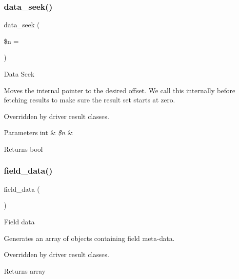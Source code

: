 \subsubsection{\texorpdfstring{data\+\_\+seek()}{data\_seek()}}
{\footnotesize\ttfamily data\+\_\+seek (\begin{DoxyParamCaption}\item[{}]{\$n = {} }\end{DoxyParamCaption})}

Data Seek

Moves the internal pointer to the desired offset. We call this internally before fetching results to make sure the result set starts at zero.

Overridden by driver result classes.


\begin{DoxyParams}[1]{Parameters}
int & {\em \$n} & \\
\hline
\end{DoxyParams}
\begin{DoxyReturn}{Returns}
bool 
\end{DoxyReturn}
\mbox{\label{class_c_i___d_b__result_a84bffd65e53902ade1591716749a33e3}} 
\subsubsection{\texorpdfstring{field\+\_\+data()}{field\_data()}}
{\footnotesize\ttfamily field\+\_\+data (\begin{DoxyParamCaption}{ }\end{DoxyParamCaption})}

Field data

Generates an array of objects containing field meta-\/data.

Overridden by driver result classes.

\begin{DoxyReturn}{Returns}
array 
\end{DoxyReturn}
\mbox{\label{class_c_i___d_b__result_a9d7ddad4b02edf86c4f1ec27c0c8a2d7}} 
